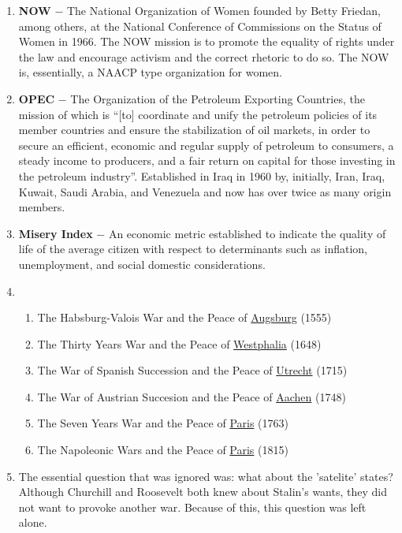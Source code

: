 \documentclass[12pt]{article}
\begin{document}
\begin{flushleft}
\begin{enumerate}
    \item \textbf{NOW} $-$ The National Organization of Women founded by Betty Friedan, among others, at the National Conference of Commissions on the Status of Women in 1966. The NOW mission is to promote the equality of rights under the law and encourage activism and the correct rhetoric to do so. The NOW is, essentially, a NAACP type organization for women. 

    \item \textbf{OPEC} $-$ The Organization of the Petroleum Exporting Countries, the mission of which is ``[to] coordinate and unify the petroleum policies of its member countries and ensure the stabilization of oil markets, in order to secure an efficient, economic and regular supply of petroleum to consumers, a steady income to producers, and a fair return on capital for those investing in the petroleum industry''. Established in Iraq in 1960 by, initially, Iran, Iraq, Kuwait, Saudi Arabia, and Venezuela and now has over twice as many origin members. 

    \item \textbf{Misery Index} $-$ An economic metric established to indicate the quality of life of the average citizen with respect to determinants such as inflation, unemployment, and social domestic considerations.

\item \begin{enumerate}[label=\alph*.]

    \item The Habsburg-Valois War and the Peace of \underline{Augsburg} (1555)
    \item The Thirty Years War and the Peace of \underline{Westphalia} (1648)
    \item The War of Spanish Succession and the Peace of \underline{Utrecht} (1715)
    \item The War of Austrian Succesion and the Peace of \underline{Aachen} (1748)
    \item The Seven Years War and the Peace of \underline{Paris} (1763)
    \item The Napoleonic Wars and the Peace of \underline{Paris} (1815)


\end{enumerate}

    \item The essential question that was ignored was: what about the 'satelite' states? Although Churchill and Roosevelt both knew about Stalin's wants, they did not want to provoke another war. Because of this, this question was left alone.


\end{enumerate}
\end{flushleft}
\end{document}
